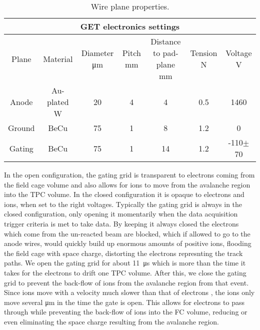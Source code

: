  \begin{table*}[!htb]
 \centering
{}
\begin{tabular}{@{}ccccccc@{}}\toprule 
\multicolumn{7}{c}{GET electronics settings}\\
\midrule
 Plane & Material & Diameter \si{\micro\metre} & Pitch \si{\milli\metre} & Distance to pad-plane \si{\milli\metre}& Tension \si{\newton} & Voltage \si{\volt}\\ [0.5ex] 
 Anode  & Au-plated W   &  20  &  4  &  4   &  0.5  &  1460  \\
 Ground & BeCu          &  75  &  1  &  8   &  1.2  &  0     \\ 
 Gating & BeCu          &  75  &  1  &  14   &  1.2 &  -110$\pm$ 70\\ 
 \bottomrule
\end{tabular}
\caption{Wire plane properties.}
\label{tb:wireplane}
\end{table*}

In the open configuration, the gating grid is transparent to electrons coming from the field cage volume and also allows for ions to move from the avalanche region into the TPC volume. In the closed configuration it is opaque to electrons and ions, when set to the right voltages. Typically the gating grid is always in the closed configuration, only opening it momentarily when the data acquisition trigger criteria is met to take data. By keeping it always closed the electrons which come from the un-reacted beam are blocked,  which if allowed to go to the anode wires, would quickly build up enormous amounts of positive ions, flooding the field cage with space charge, distorting the electrons represnting the track paths. We open the gating grid for about \SI{11}{\micro\second} which is more than the time it takes for the electrons to drift one TPC volume. After this, we close the gating grid to prevent the back-flow of ions from the avalanche region from that event. Since ions move with a velocity much slower than that of electrons \cite{blumrol}, the ions only move several \si{\micro\metre} in the time the gate is open. This allows for electrons to pass through while preventing the back-flow of ions into the FC volume, reducing or even eliminating the space charge resulting from the avalanche region.

